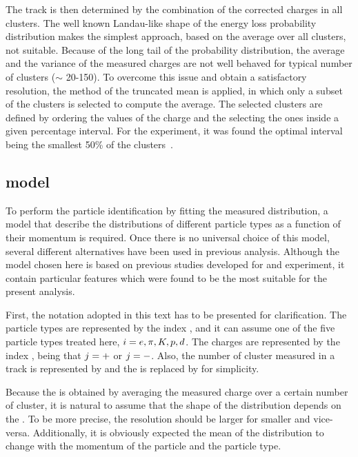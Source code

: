 The track \dedx is then determined by the combination of the corrected 
charges in all clusters. The well known Landau-like shape of the
energy loss probability distribution makes the simplest approach,
based on the average over all clusters, not suitable. Because of the
long tail of the probability distribution, the average and the variance
of the measured charges are not well behaved for typical number of clusters
($\sim$ 20-150). To overcome this issue and obtain a satisfactory \dedx resolution,
the method of the truncated mean is applied, in which only a subset of the clusters
is selected to compute the average. The selected clusters are defined by ordering
the values of the charge and the selecting the ones inside a given percentage interval.
For the \NASixtyOne experiment, it was found the optimal interval being the smallest 50\%
of the clusters~\cite{GaborVeresThesis}.


\subsection{\dedx model}
\label{sec:hadron:dedx:model}


To perform the particle identification by fitting the
measured \dedx distribution, a model that describe
the \dedx distributions of different particle types as a function
of their momentum \p is required. Once there is no universal choice
of this model, several different alternatives have been
used in previous analysis. Although the model chosen here 
is based on previous studies developed for
\NAFortyNine and \NASixtyOne experiment, it contain
particular features which were found to be the most suitable
for the present analysis.

First, the notation adopted in this text has to be presented
for clarification. The particle types are represented by
the index \ipart, and it can assume one of the five particle types
treated here, $i=e, \pi, K, p, d$. The charges are represented by
the index \ich, being that $j = +$ or $j=-$. Also, the number of
cluster measured in a track is represented by \ncl and the \dedx
is replaced by \eps for simplicity.

Because the \dedx is obtained by averaging the measured charge
over a certain number of cluster, it is natural to assume that
the shape of the \eps distribution depends on the \ncl.
To be more precise, the \eps resolution should be 
larger for smaller \ncl and vice-versa. 
Additionally, it is obviously expected the mean of the distribution
to change with the momentum of the particle \p and the particle type.


